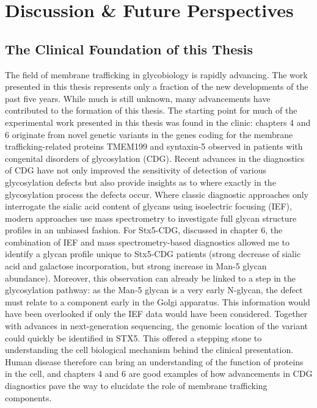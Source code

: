 


\chapter{Discussion \& Future Perspectives}

\clearpage
{}

\section{The Clinical Foundation of this Thesis}

The field of membrane trafficking in glycobiology is rapidly advancing. The work presented in this thesis represents only a fraction of the new developments of the past five years. While much is still unknown, many advancements have contributed to the formation of this thesis. The starting point for much of the experimental work presented in this thesis was found in the clinic: chapters 4 and 6 originate from novel genetic variants in the genes coding for the membrane trafficking-related proteins TMEM199 and syntaxin-5 observed in patients with congenital disorders of glycosylation (CDG). Recent advances in the diagnostics of CDG have not only improved the sensitivity of detection of various glycosylation defects but also provide insights as to where exactly in the glycosylation process the defects occur. Where classic diagnostic approaches only interrogate the sialic acid content of glycans using isoelectric focusing (IEF)\cite{marklova_screening_2007}, modern approaches use mass spectrometry to investigate full glycan structure profiles in an unbiased fashion\cite{abu_bakar_clinical_2018,van_scherpenzeel_high-resolution_2015,hipgrave_ederveen_dissecting_2020}. For Stx5-CDG, discussed in chapter 6, the combination of IEF and mass spectrometry-based diagnostics allowed me to identify a glycan profile unique to Stx5-CDG patients (strong decrease of sialic acid and galactose incorporation, but strong increase in Man-5 glycan abundance). Moreover, this observation can already be linked to a step in the glycosylation pathway: as the Man-5 glycan is a very early N-glycan, the defect must relate to a component early in the Golgi apparatus. This information would have been overlooked if only the IEF data would have been considered. Together with advances in next-generation sequencing\cite{de_ligt_diagnostic_2012,gilissen_genome_2014}, the genomic location of the variant could quickly be identified in STX5. This offered a stepping stone to understanding the cell biological mechanism behind the clinical presentation. Human disease therefore can bring an understanding of the function of proteins in the cell, and chapters 4 and 6 are good examples of how advancements in CDG diagnostics pave the way to elucidate the role of membrane trafficking components.

